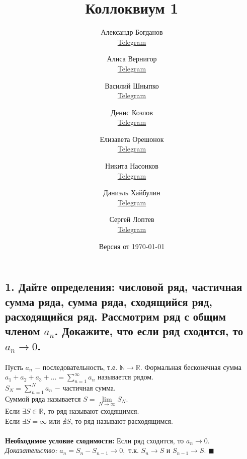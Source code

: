 \documentclass[a4paper, fleqn]{article}
\title{Коллоквиум 1}
\author{
    Александр Богданов   \\ \href{https://t.me/SphericalPotatoInVacuum}{Telegram} \and
    Алиса Вернигор       \\ \href{https://t.me/allisyonok}{Telegram} \and
    Василий Шныпко       \\ \href{https://t.me/yourvash}{Telegram} \and
    Денис Козлов         \\ \href{https://t.me/DKozl50}{Telegram} \and
    Елизавета Орешонок   \\ \href{https://t.me/eaoresh}{Telegram} \and
    Никита Насонков      \\ \href{https://t.me/nnv_nick}{Telegram} \and
    Даниэль Хайбулин      \\ \href{https://t.me/kiDaniel}{Telegram} \and
    Сергей Лоптев        \\ \href{https://t.me/beast_sl}{Telegram}
}
\date{Версия от {\ddmmyyyydate\today} \currenttime}
\begin{document}
    \maketitle
    
    
    \subsection*{1. Дайте определения: числовой ряд, частичная сумма ряда, сумма ряда, сходящийся ряд, расходящийся ряд. Рассмотрим ряд с общим членом $a_n$. Докажите, что если ряд сходится, то $a_n \rightarrow 0$.}
    Пусть $a_n$ $-$ последовательность, т.е. $\mathbb{N} \rightarrow \mathbb{R}$. 
    Формальная бесконечная сумма $a_1 + a_2 + a_3 + ... = \sum\limits_{n = 1}^{\infty} a_n$ называется рядом. \\
    $S_N = \sum\limits_{n = 1}^N a_n$ $-$ частичная сумма. \\
    Суммой ряда называется $S = \lim\limits_{N\rightarrow \infty} S_N$. \\
    Если $\exists S \in \mathbb{R}$, то ряд называют сходящимся. \\
    Если $\exists S = \infty$ или $\nexists S$, то ряд называют расходящимся. \\ \\
    \textbf{Необходимое условие сходимости: } Если ряд сходится, то $a_n \rightarrow 0$. \\
    \textit{Доказательство: } $a_n = S_n - S_{n - 1} \rightarrow 0, $ т.к. $S_n \rightarrow S$ и $S_{n - 1} \rightarrow S$. $\blacksquare$ \\

\end{document}
